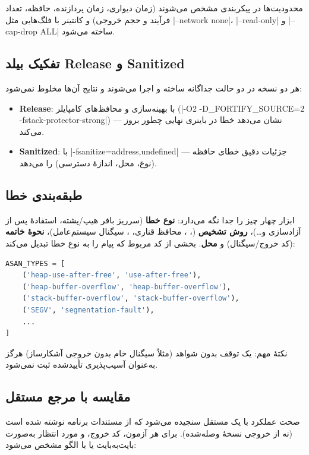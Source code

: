 \documentclass[12pt]{exam}
\begin{document}
محدودیت‌ها در پیکربندی مشخص می‌شوند (زمان دیواری، زمان پردازنده، حافظه، تعداد فرآیند و
حجم خروجی) و کانتینر با فلگ‌هایی مثل \codeword|--network none|، \codeword|--read-only|
و \codeword|--cap-drop ALL| ساخته می‌شود.

\subsection{تفکیک بیلد Release و Sanitized}

هر دو نسخه در دو حالت جداگانه ساخته و اجرا می‌شوند و نتایج آن‌ها مخلوط نمی‌شود:
\begin{itemize}
\item \textbf{Release}: با بهینه‌سازی و محافظ‌های کامپایلر
(\codeword|-O2 -D\_FORTIFY\_SOURCE=2 -fstack-protector-strong|) — نشان می‌دهد خطا در
باینری نهایی چطور بروز می‌کند.
\item \textbf{Sanitized}: با \codeword|-fsanitize=address,undefined| — جزئیات دقیق خطای
حافظه (نوع، محل، اندازهٔ دسترسی) را می‌دهد.
\end{itemize}

\subsection{طبقه‌بندی خطا}

ابزار چهار چیز را جدا نگه می‌دارد: \textbf{نوع خطا} (سرریز بافر هیپ/پشته، استفادهٔ پس
از آزادسازی و\ldots)، \textbf{روش تشخیص} (، ، محافظ قناری،
، سیگنال سیستم‌عامل)، \textbf{نحوهٔ خاتمه} (کد خروج/سیگنال) و \textbf{محل}.
بخشی از کد مربوط که پیام  را به نوع خطا تبدیل می‌کند:

\begin{latin}
\begin{lstlisting}[language=Python]
ASAN_TYPES = [
    ('heap-use-after-free', 'use-after-free'),
    ('heap-buffer-overflow', 'heap-buffer-overflow'),
    ('stack-buffer-overflow', 'stack-buffer-overflow'),
    ('SEGV', 'segmentation-fault'),
    ...
]
\end{lstlisting}
\end{latin}

نکتهٔ مهم: یک توقف بدون شواهد (مثلاً سیگنال خام بدون خروجی آشکارساز) هرگز به‌عنوان
آسیب‌پذیری تأییدشده ثبت نمی‌شود.

\subsection{مقایسه با مرجع مستقل}

صحت عملکرد با یک  مستقل سنجیده می‌شود که از مستندات برنامه نوشته شده است
(نه از خروجی نسخهٔ وصله‌شده). برای هر آزمون، کد خروج،  و  مورد
انتظار به‌صورت بایت‌به‌بایت یا با الگو مشخص می‌شود:
\end{document}
